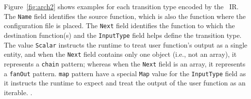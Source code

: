 Figure~\ref{fig:arch2} shows examples for each transition type encoded
by the \name{}~IR. The \texttt{Name} field identifies the source function, which is also the function where the
configuration file is placed. The \texttt{Next} field identifies the function
to which the destination function(s) and the
\texttt{InputType} field helps define the transition type. The value
\texttt{Scalar} instructs the runtime to treat user function's output as a
single entity, and when the \texttt{Next} field contains only one object
(i.e., not an array), it represents a \texttt{chain} pattern; whereas when the
\texttt{Next} field is an array, it represents a \texttt{fanOut} pattern.
\texttt{map} pattern have a special \texttt{Map} value for the
\texttt{InputType} field as it instructs the runtime to expect and treat the
output of the user function as an iterable. .








